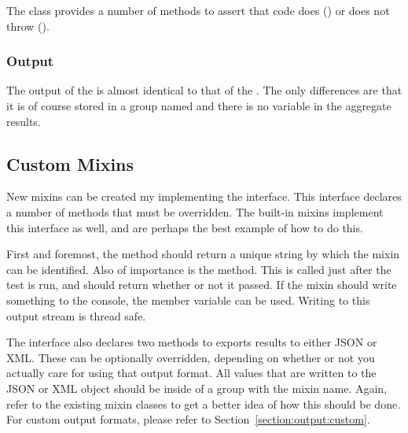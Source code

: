 The  class provides a number of methods to assert that code does () or does not throw ().

\subsubsection{Output}

The output of the  is almost identical to that of the . The only differences are that it is of course stored in a group named  and there is no  variable in the aggregate results.



\subsection{Custom Mixins}
\label{section:mixins:custom}

New mixins can be created my implementing the  interface. This interface declares a number of methods that must be overridden. The built-in mixins implement this interface as well, and are perhaps the best example of how to do this.

First and foremost, the  method should return a unique string by which the mixin can be identified. Also of importance is the  method. This is called just after the test is run, and should return whether or not it passed. If the mixin should write something to the console, the  member variable can be used. Writing to this output stream is thread safe.

The  interface also declares two methods to exports results to either JSON or XML. These can be optionally overridden, depending on whether or not you actually care for using that output format. All values that are written to the JSON or XML object should be inside of a group with the mixin name. Again, refer to the existing mixin classes to get a better idea of how this should be done. For custom output formats, please refer to Section~\ref{section:output:custom}.

